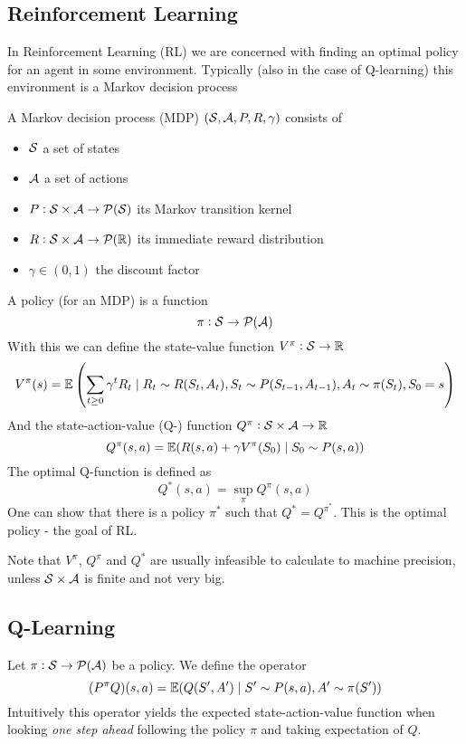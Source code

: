 \subsection{Reinforcement Learning}
In Reinforcement Learning (RL) we are concerned with finding an optimal policy
for an agent in some environment.
Typically (also in the case of Q-learning) this environment is a
Markov decision process

\begin{defn}
	A Markov decision process (MDP) $(\mathcal{S}, \mathcal{A}, P, R, \gamma)$
	consists of
\begin{itemize}
\item $\mathcal{S}$ a set of states
\item $\mathcal{A}$ a set of actions
\item $P : \mathcal{S} \times \mathcal{A} \to \mathcal{P}(\mathcal{S})$ its Markov transition kernel
\item $R : \mathcal{S} \times \mathcal{A} \to \mathcal{P}(\mathbb{R})$ its immediate reward distribution
\item $\gamma \in (0,1)$ the discount factor
\end{itemize}
\end{defn}

A policy (for an MDP) is a function
\[\pi : \mathcal{S} \to \mathcal{P}(\mathcal{A})\]
With this we can define the state-value function $V^\pi : \mathcal{S} \to \mathbb{R}$
\[ V^\pi(s) = \mathbb{E} \left( \sum_{t \geq 0} \gamma^t R_t \mid
R_t \sim R(S_t, A_t), S_t \sim P(S_{t-1}, A_{t-1}), A_t \sim \pi(S_t), S_0 = s
\right) \]
And the state-action-value (Q-) function $Q^\pi : \mathcal{S} \times \mathcal{A} \to \mathbb{R}$
\[ Q^\pi(s, a) = \mathbb{E} (R(s, a) + \gamma V^\pi(S_0) \mid S_0 \sim P(s, a)) \]
The optimal Q-function is defined as
\[ Q^*(s, a) = \sup_\pi Q^\pi(s, a) \]
One can show that there is a policy $\pi^*$ such that $Q^* = Q^{\pi^*}$.
This is the optimal policy - the goal of RL. 

Note that $V^\pi$, $Q^\pi$ and $Q^*$ are usually infeasible to calculate to
machine precision, unless $\mathcal{S} \times \mathcal{A}$ is finite and not very big.

\subsection{Q-Learning}

Let $\pi: \mathcal{S} \to \mathcal{P}(\mathcal{A})$ be a policy. We define the operator
\[ (P^\pi Q)(s, a) = \mathbb{E} (Q(S', A') \mid S' \sim P(s, a), A' \sim \pi(S')) \]
Intuitively this operator yields the expected state-action-value function
when looking \emph{one step ahead} following the policy $\pi$ and taking
expectation of $Q$.

